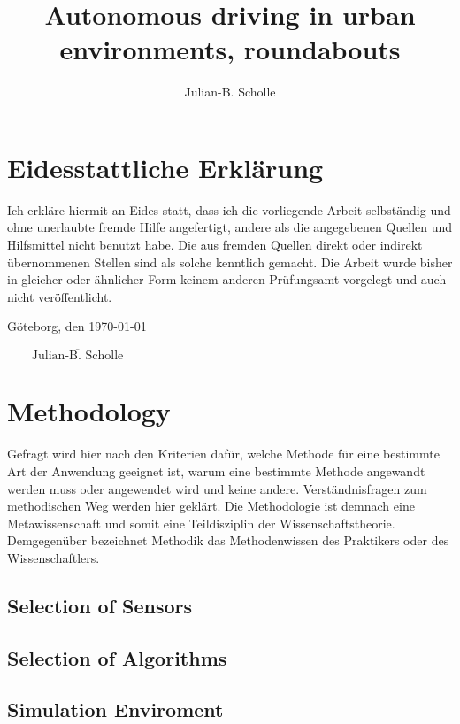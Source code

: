 \documentclass[11pt,oneside,openright]{mpreport}
\title{Autonomous driving in urban environments, roundabouts}
\author{Julian-B. Scholle}
\begin{document}


\chapter*{Eidesstattliche Erklärung}
Ich erkläre hiermit an Eides statt, dass ich die vorliegende Arbeit selbständig und
ohne unerlaubte fremde Hilfe angefertigt, andere als die angegebenen Quellen und
Hilfsmittel nicht benutzt habe. Die aus fremden Quellen direkt oder indirekt
übernommenen Stellen sind als solche kenntlich gemacht.
Die Arbeit wurde bisher in gleicher oder ähnlicher Form keinem anderen
Prüfungsamt vorgelegt und auch nicht veröffentlicht.

\noindent Göteborg, den \today
\begin{flushright}
$\overline{~~~~~~~~~\mbox{Julian-B. Scholle}~~~~~~~~~}$
\end{flushright}




\chapter{Methodology}
Gefragt wird hier nach den Kriterien dafür, welche Methode für eine bestimmte Art der Anwendung geeignet ist, warum eine bestimmte Methode angewandt werden muss oder angewendet wird und keine andere. Verständnisfragen zum methodischen Weg werden hier geklärt. Die Methodologie ist demnach eine Metawissenschaft und somit eine Teildisziplin der Wissenschaftstheorie. Demgegenüber bezeichnet Methodik das Methodenwissen des Praktikers oder des Wissenschaftlers.

\section{Selection of Sensors}
\section{Selection of Algorithms}
\section{Simulation Enviroment}
\end{document}
